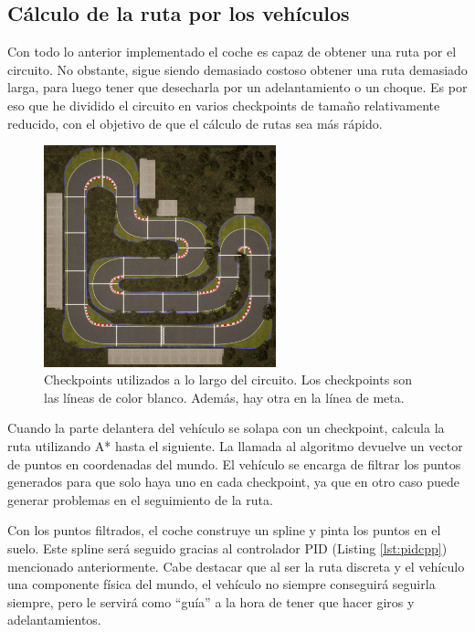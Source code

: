 \subsection{Cálculo de la ruta por los vehículos}

Con todo lo anterior implementado el coche es capaz de obtener una ruta por el circuito. No obstante, sigue siendo demasiado costoso obtener una ruta demasiado larga, para luego tener que desecharla por un adelantamiento o un choque. Es por eso que he dividido el circuito en varios checkpoints de tamaño relativamente reducido, con el objetivo de que el cálculo de rutas sea más rápido.


\begin{figure}[H]
    \centering
    \includegraphics[width=0.6\textwidth]{imagenes/converted/checkpoints.jpg}
    \caption{Checkpoints utilizados a lo largo del circuito. Los checkpoints son las líneas de color blanco. Además, hay otra en la línea de meta.}
    \label{fig:checkpointunreal}
\end{figure}

Cuando la parte delantera del vehículo se solapa con un checkpoint, calcula la ruta utilizando A* hasta el siguiente. La llamada al algoritmo devuelve un vector de puntos en coordenadas del mundo. El vehículo se encarga de filtrar los puntos generados para que solo haya uno en cada checkpoint, ya que en otro caso puede generar problemas en el seguimiento de la ruta.

\bigskip

Con los puntos filtrados, el coche construye un spline y pinta los puntos en el suelo. Este spline será seguido gracias al controlador PID (Listing \ref{lst:pidcpp}) mencionado anteriormente. Cabe destacar que al ser la ruta discreta y el vehículo una componente física del mundo, el vehículo no siempre conseguirá seguirla siempre, pero le servirá como ``guía'' a la hora de tener que hacer giros y adelantamientos.

